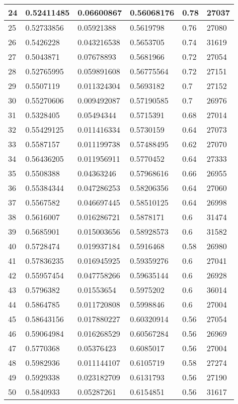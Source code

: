 \begin{longtable}{|l|l|l|l|l|l|}
24 & 0.52411485 & 0.06600867 & 0.56068176 & 0.78 & 27037 \\ \hline 
25 & 0.52733856 & 0.05921388 & 0.5619798 & 0.76 & 27080 \\ \hline 
26 & 0.5426228 & 0.043216538 & 0.5653705 & 0.74 & 31619 \\ \hline 
27 & 0.5043871 & 0.07678893 & 0.5681966 & 0.72 & 27054 \\ \hline 
28 & 0.52765995 & 0.059891608 & 0.56775564 & 0.72 & 27151 \\ \hline 
29 & 0.5507119 & 0.011324304 & 0.5693182 & 0.7 & 27152 \\ \hline 
30 & 0.55270606 & 0.009492087 & 0.57190585 & 0.7 & 26976 \\ \hline 
31 & 0.5328405 & 0.05494344 & 0.5715391 & 0.68 & 27014 \\ \hline 
32 & 0.55429125 & 0.011416334 & 0.5730159 & 0.64 & 27073 \\ \hline 
33 & 0.5587157 & 0.011199738 & 0.57488495 & 0.62 & 27070 \\ \hline 
34 & 0.56436205 & 0.011956911 & 0.5770452 & 0.64 & 27333 \\ \hline 
35 & 0.5508388 & 0.04363246 & 0.57968616 & 0.66 & 26955 \\ \hline 
36 & 0.55384344 & 0.047286253 & 0.58206356 & 0.64 & 27060 \\ \hline 
37 & 0.5567582 & 0.046697445 & 0.58510125 & 0.64 & 26998 \\ \hline 
38 & 0.5616007 & 0.016286721 & 0.5878171 & 0.6 & 31474 \\ \hline 
39 & 0.5685901 & 0.015003656 & 0.58928573 & 0.6 & 31582 \\ \hline 
40 & 0.5728474 & 0.019937184 & 0.5916468 & 0.58 & 26980 \\ \hline 
41 & 0.57836235 & 0.016945925 & 0.59359276 & 0.6 & 27041 \\ \hline 
42 & 0.55957454 & 0.047758266 & 0.59635144 & 0.6 & 26928 \\ \hline 
43 & 0.5796382 & 0.01553654 & 0.5975202 & 0.6 & 36014 \\ \hline 
44 & 0.5864785 & 0.011720808 & 0.5998846 & 0.6 & 27004 \\ \hline 
45 & 0.58643156 & 0.017880227 & 0.60320914 & 0.56 & 27054 \\ \hline 
46 & 0.59064984 & 0.016268529 & 0.60567284 & 0.56 & 26969 \\ \hline 
47 & 0.5770368 & 0.05376423 & 0.6085017 & 0.56 & 27004 \\ \hline 
48 & 0.5982936 & 0.011144107 & 0.6105719 & 0.58 & 27274 \\ \hline 
49 & 0.5929338 & 0.023182709 & 0.6131793 & 0.56 & 27190 \\ \hline 
50 & 0.5840933 & 0.05287261 & 0.6154851 & 0.56 & 31617 \\ \hline 
\end{longtable}
